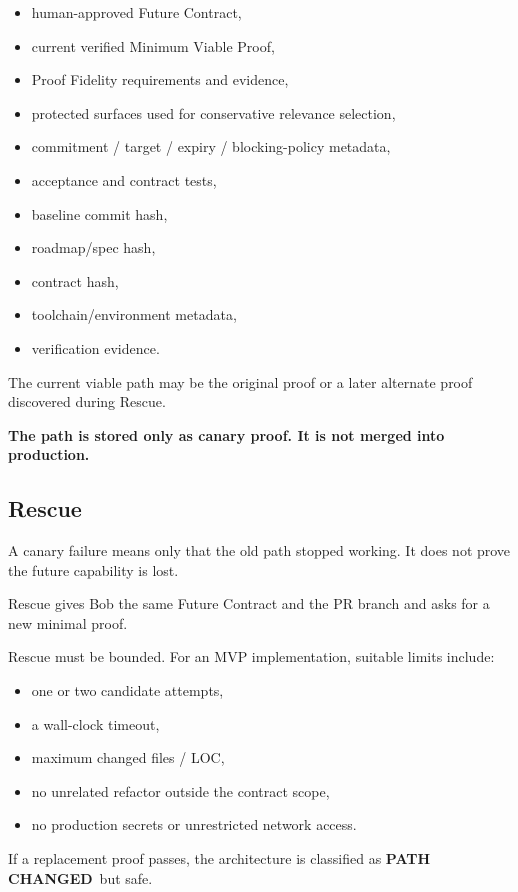 \documentclass[12pt]{article}
\newcommand{\statuschanged}{\textbf{\color{amber}PATH CHANGED}}
\begin{document}
\begin{itemize}
    \item human-approved Future Contract,
    \item current verified Minimum Viable Proof,
    \item Proof Fidelity requirements and evidence,
    \item protected surfaces used for conservative relevance selection,
    \item commitment / target / expiry / blocking-policy metadata,
    \item acceptance and contract tests,
    \item baseline commit hash,
    \item roadmap/spec hash,
    \item contract hash,
    \item toolchain/environment metadata,
    \item verification evidence.
\end{itemize}

The current viable path may be the original proof or a later alternate proof discovered during Rescue.

\textbf{The path is stored only as canary proof. It is not merged into production.}

\subsection{Rescue}

A canary failure means only that the old path stopped working. It does not prove the future capability is lost.

Rescue gives Bob the same Future Contract and the PR branch and asks for a new minimal proof.

Rescue must be bounded. For an MVP implementation, suitable limits include:

\begin{itemize}
    \item one or two candidate attempts,
    \item a wall-clock timeout,
    \item maximum changed files / LOC,
    \item no unrelated refactor outside the contract scope,
    \item no production secrets or unrestricted network access.
\end{itemize}

If a replacement proof passes, the architecture is classified as \statuschanged\ but safe.
\end{document}
